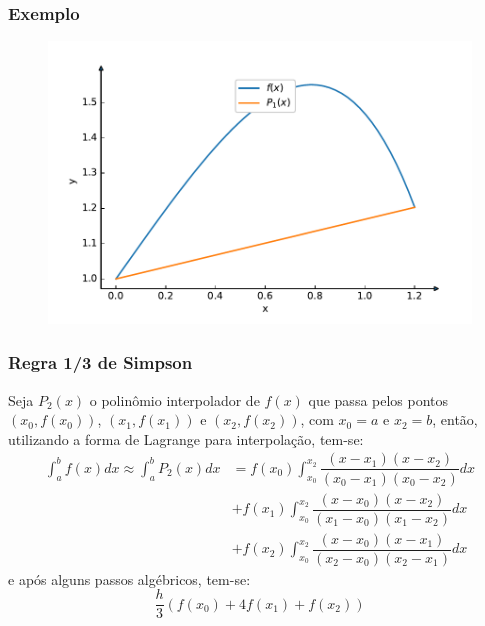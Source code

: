 \documentclass{beamer}
\theoremstyle{mystyle}
\begin{document}
	\begin{frame}
		\frametitle{Exemplo}
		\begin{figure}
			\centering
			\includegraphics[width=1.0\linewidth]{Figuras/grafico_05}
			\label{fig:grafico05}
		\end{figure}
	\end{frame}

	\begin{frame}
		\frametitle{Regra 1/3 de Simpson}
		Seja $ P_{2} (x) $ o polinômio interpolador de $ f (x) $ que passa pelos pontos $ (x_{0} , f (x_{0})) $, $ (x_{1} , f (x_{1})) $ e $ (x_{2} , f (x_{2})) $, com $ x_{0} = a $ e $ x_{2} = b $, então, utilizando a forma de Lagrange para interpolação, tem-se:
		\begin{align*}
			\int_{a}^{b} f(x) dx \approx \int_{a}^{b} P_{2}(x) dx
			&= f(x_{0})\int_{x_{0}}^{x_{2}} \dfrac{(x - x_{1})(x - x_{2})}{(x_{0} - x_{1})(x_{0} - x_{2})} dx\\
			&+ f(x_{1})\int_{x_{0}}^{x_{2}} \dfrac{(x - x_{0})(x - x_{2})}{(x_{1} - x_{0})(x_{1} - x_{2})} dx\\
			&+ f(x_{2})\int_{x_{0}}^{x_{2}} \dfrac{(x - x_{0})(x - x_{1})}{(x_{2} - x_{0})(x_{2} - x_{1})} dx
		\end{align*}
		e após alguns passos algébricos, tem-se:
		\begin{equation*}
			\dfrac{h}{3}(f(x_{0}) + 4f(x_{1}) + f(x_{2}))
		\end{equation*}
	\end{frame}
	
\end{document}
